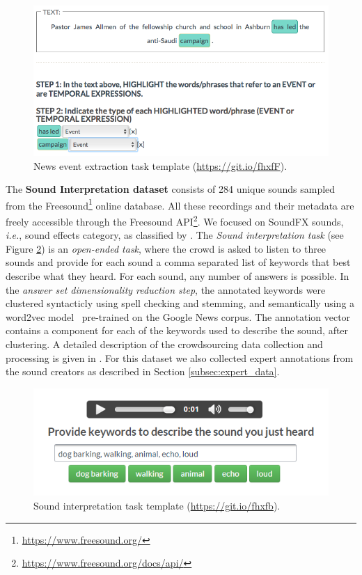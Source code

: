 \begin{figure}[htb!]
\centering
\includegraphics[width=0.8\linewidth]{img/news_event_extraction.png}
\caption{News event extraction task template (\url{https://git.io/fhxfF}).}
\label{fig:screenshot_news}
\end{figure}

The \textbf{Sound Interpretation dataset} consists of 284 unique sounds sampled from the Freesound\footnote{\url{https://www.freesound.org/}} online database. All these recordings and their metadata are freely accessible through the Freesound API\footnote{\url{https://www.freesound.org/docs/api/}}. We focused on SoundFX sounds, \emph{i.e.}, sound effects category, as classified by \cite{font2014audio}. The \emph{Sound interpretation task} (see Figure \ref{fig:screenshot_sounds}) is an \textit{open-ended task}, where the crowd is asked to listen to three sounds and provide for each sound a comma separated list of keywords that best describe what they heard. For each sound, any number of answers is possible. In the \textit{answer set dimensionality reduction step}, the annotated keywords were clustered syntacticly using spell checking and stemming, and semantically using a word2vec model~\cite{mikolov2013distributed} pre-trained on the Google News corpus.  The annotation vector contains a component for each of the keywords used to describe the sound, after clustering. A detailed description of the crowdsourcing data collection and processing is given in \cite{miltenburg2016}. For this dataset we also collected expert annotations from the sound creators as described in Section \ref{subsec:expert_data}.

\begin{figure}[htb!]
\centering
\includegraphics[width=0.8\linewidth]{img/sound-task.png}
\caption{Sound interpretation task template (\url{https://git.io/fhxfb}).}
\label{fig:screenshot_sounds}
\end{figure}


